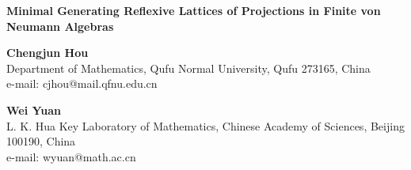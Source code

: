 \documentclass[12pt]{article}
\begin{document}
\begin{center}
{\Large \bf Minimal Generating Reflexive Lattices of Projections in
Finite von Neumann Algebras}
\end{center}

\begin{center}

{\bf Chengjun Hou}\\

Department of Mathematics, Qufu Normal University, Qufu 273165,
China\\
e-mail: cjhou@mail.qfnu.edu.cn\\
\vspace{2mm}

{\bf Wei Yuan}\\
L. K. Hua Key Laboratory of Mathematics, Chinese Academy of
Sciences,
Beijing 100190, China\\
e-mail: wyuan@math.ac.cn

\end{center}
\end{document}
